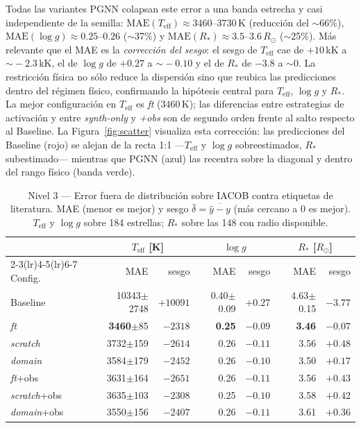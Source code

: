 \documentclass[sigconf,ACM]{acmart}
\begin{document}
Todas las variantes PGNN colapsan este error a una banda estrecha y casi
independiente de la semilla: $\mathrm{MAE}(T_\mathrm{eff})\!\approx\!3460$--$3730$\,K
(reducción del $\sim$66\%), $\mathrm{MAE}(\log g)\!\approx\!0.25$--$0.26$
($\sim$37\%) y $\mathrm{MAE}(R_*)\!\approx\!3.5$--$3.6\,R_\odot$ ($\sim$25\%).
Más relevante que el MAE es la \emph{corrección del sesgo}: el sesgo de
$T_\mathrm{eff}$ cae de $+10$\,kK a $\sim\!-2.3$\,kK, el de $\log g$ de $+0.27$ a
$\sim\!-0.10$ y el de $R_*$ de $-3.8$ a $\sim\!0$. La restricción física no sólo
reduce la dispersión sino que reubica las predicciones dentro del régimen físico,
confirmando la hipótesis central para $T_\mathrm{eff}$, $\log g$ y $R_*$. La mejor
configuración en $T_\mathrm{eff}$ es \emph{ft} ($3460$\,K); las diferencias entre
estrategias de activación y entre \emph{synth-only} y \emph{+obs} son de segundo
orden frente al salto respecto al Baseline. La Figura~\ref{fig:scatter} visualiza
esta corrección: las predicciones del Baseline (rojo) se alejan de la recta 1:1
---$T_\mathrm{eff}$ y $\log g$ sobreestimados, $R_*$ subestimado--- mientras que
PGNN (azul) las recentra sobre la diagonal y dentro del rango físico (banda verde).

\begin{table}[htbp]
  \caption{Nivel 3 --- Error fuera de distribución sobre IACOB contra etiquetas de
  literatura. MAE (menor es mejor) y sesgo $\bar{\delta}=\overline{\hat{y}-y}$
  (más cercano a 0 es mejor). $T_\mathrm{eff}$ y $\log g$ sobre 184 estrellas;
  $R_*$ sobre las 148 con radio disponible.}
  \label{tab:iacob}
  \scriptsize
  \setlength{\tabcolsep}{2.5pt}
  \begin{tabular}{lrrrrrr}
    \toprule
    & \multicolumn{2}{c}{$T_\mathrm{eff}$ [K]} & \multicolumn{2}{c}{$\log g$} & \multicolumn{2}{c}{$R_*$ [$R_\odot$]} \\
    \cmidrule(lr){2-3}\cmidrule(lr){4-5}\cmidrule(lr){6-7}
    Config. & MAE & sesgo & MAE & sesgo & MAE & sesgo \\
    \midrule
    Baseline           & 10343$\pm$2748 & $+10091$ & 0.40$\pm$0.09 & $+0.27$ & 4.63$\pm$0.15 & $-3.77$ \\
    \emph{ft}          & \textbf{3460}$\pm$85  & $-2318$ & \textbf{0.25} & $-0.09$ & \textbf{3.46} & $-0.07$ \\
    \emph{scratch}     & 3732$\pm$159 & $-2614$ & 0.26 & $-0.11$ & 3.56 & $+0.48$ \\
    \emph{domain}      & 3584$\pm$179 & $-2452$ & 0.26 & $-0.10$ & 3.50 & $+0.17$ \\
    \emph{ft}+obs      & 3631$\pm$164 & $-2651$ & 0.26 & $-0.11$ & 3.56 & $+0.43$ \\
    \emph{scratch}+obs & 3635$\pm$103 & $-2308$ & 0.25 & $-0.10$ & 3.58 & $+0.42$ \\
    \emph{domain}+obs  & 3550$\pm$156 & $-2407$ & 0.26 & $-0.11$ & 3.61 & $+0.36$ \\
    \bottomrule
  \end{tabular}
\end{table}
\end{document}
